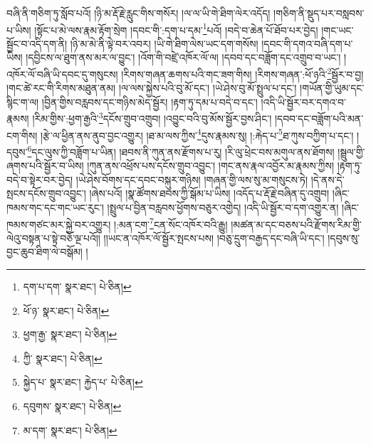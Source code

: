 བཞི་ནི་གཅིག་ཏུ་སློབ་པའོ། །ཉི་མ་རྡོ་རྗེ་རླུང་གིས་གསོར། །ལ་ལ་ཡི་གེ་ཐིག་ལེར་འདོད། །གཅིག་ནི་སྡུད་པར་བསླབས་པ་ཡིས། །སྟོང་པ་མེ་ལས་རྣམ་རྟོག་སྲེག །དབང་གི་:དག་པ་དམ་\footnote{དག་པ་དག་  སྣར་ཐང་།  པེ་ཅིན། }པའོ། །བདེ་བ་ཆེན་པོ་ཐོབ་པར་བྱེད། །གང་ཡང་སྦྱོང་བ་འདི་དག་ནི། །ཉི་མ་མེ་ནི་ལྟེ་བར་འབར། །ཡི་གེ་ཐིག་ལེས་ཡང་དག་གསོས། །དབང་གི་དགའ་བཞི་དག་པ་ཡིས། །དབྱིངས་ལ་ཐུག་ནས་མར་ལ་བྱུང་། །འོག་གི་བཛྲེ་འཁོར་ལོ་ལ། །དབབ་དང་བཟློག་དང་འགྲུབ་བ་ཡང་། །འཁོར་ལོ་བཞི་ཡི་དབང་དུ་གསུངས། །རིགས་གཞན་ཆགས་པའི་གང་ཟག་གིས། །རིགས་གཞན་:ཕོ་ཉའི་\footnote{ཕོ་ཉ་  སྣར་ཐང་།  པེ་ཅིན། }སྦྱོར་བ་བྱ། །གང་ཚེ་རང་གི་རིགས་མཐུན་ནམ། །ལ་ལས་སྐྱེས་པའི་བུ་མོ་དང་། །ཡེ་ཤེས་བུ་མོ་སྤྲུལ་པ་དང་། །གཡོན་གྱི་ཡུམ་དང་སྙིང་ག་ལ། །བྱིན་གྱིས་བརླབས་དང་གཉིས་མེད་སྦྱོར། །རྟག་ཏུ་དམ་པ་བདེ་བ་དང་། །འདི་ཡི་སྦྱོར་བར་དགའ་བ་རྣམས། །རིམ་གྱིས་:ཕྱག་རྒྱའི་\footnote{ཕྱག་རྒྱ་  སྣར་ཐང་།  པེ་ཅིན། }དངོས་གྲུབ་འགྲུབ། །འབྱུང་བའི་བུ་མོས་སྦྱོར་བྱས་ཤིང་། །དབབ་དང་བཟློག་པའི་མན་ངག་གིས། །རྩེ་ལ་ཕྱིན་ནས་ནུབ་བྱང་འགྱུར། །ཐ་མ་ལས་ཀྱིས་\footnote{ཀྱི་  སྣར་ཐང་།  པེ་ཅིན། }དུས་རྣམས་སུ། །:རྐེད་པ་\footnote{སྐྱེད་པ་  སྣར་ཐང་། རྐྱེད་པ་  པེ་ཅིན། }ཐ་ཀུས་བཀྱིག་པ་དང་། །དབུས་\footnote{དབུགས་  སྣར་ཐང་།  པེ་ཅིན། }དང་ལུས་ཀྱི་བཟློག་པ་ཡིན། །ཐབས་ནི་ཀུན་ནས་རྫོགས་པ་རུ། །རི་ལུ་ཕྲེང་བས་མགུལ་ནས་ཐོགས། །སྦྲུལ་གྱི་ཞགས་པའི་སྦྱོར་བ་ཡིས། །ཀུན་ནས་འཕྲོས་པས་དངོས་གྲུབ་འབྱུང་། །གང་ནས་རྣལ་འབྱོར་མ་རྣམས་ཀྱིས། །རྟག་ཏུ་བདེ་བ་སྟེར་བར་བྱེད། །ཡེ་ཤེས་བོགས་དང་དབང་བསྐུར་གཉིས། །གཞན་གྱི་ལས་སུ་མ་གསུངས་ཏེ། །དེ་ནས་དེ་སྤངས་དངོས་གྲུབ་འབྱུང་། །ཞེས་པའོ། །སྣ་ཚོགས་ཐབས་ཀྱི་སྒོམ་པ་ཡིས། །འདོད་པ་རྡོ་རྗེ་བཞིན་དུ་འགྲུབ། །ཞིང་ཁམས་གང་དང་གང་ཡང་རུང་། །སྤྲུལ་པ་བྱིན་བརླབས་ཕྱོགས་བཅུར་འགྱེད། །འདི་ཡི་སྦྱོར་བ་དག་འགྱུར་ན། །ཞིང་ཁམས་གཙང་མར་སྐྱེ་བར་འགྱུར། །:མན་ངག་\footnote{མ་དག་  སྣར་ཐང་།  པེ་ཅིན། }ངན་སོང་འཁོར་བའི་རྒྱུ། །མཚན་མ་དང་བཅས་པའི་རྫོགས་རིམ་གྱི་ལེའུ་བསྟན་པ་སྟེ་བཅོ་ལྔ་པའོ།། །།ཡང་ན་འཁོར་ལོ་སྦྱོར་སྤངས་པས། །བཅུ་དྲུག་བརྒྱད་དང་བཞི་ཡི་དང་། །དབུས་སུ་བྱང་ཆུབ་ཐིག་ལེ་བསྒོམ། །
